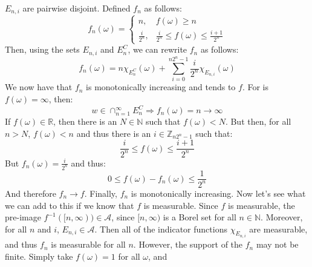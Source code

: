         $E_{n,i}$ are pairwise disjoint. Defined $f_{n}$ as
        follows:
        \begin{equation}
            f_{n}(\omega)=
            \begin{cases}
                n,&f(\omega)\geq{n}\\
                \frac{i}{2^{n}},&\frac{i}{2^{n}}
                    \leq{f}(\omega)
                    \leq\frac{i+1}{2^{n}}
            \end{cases}
        \end{equation}
        Then, using the sets $E_{n,i}$ and $E_{n}^{C}$, we
        can rewrite $f_{n}$ as follows:
        \begin{equation}
            f_{n}(\omega)=
            n\chi_{E_{n}^{C}}(\omega)+
            \sum_{i=0}^{n2^{n}-1}
                \frac{i}{2^{n}}\chi_{E_{n,i}}(\omega)
        \end{equation}
        We now have that $f_{n}$ is monotonically increasing
        and tends to $f$. For is $f(\omega)=\infty$, then:
        \begin{equation}
            w\in\cap_{n=1}^{\infty}E_{n}^{C}
            \Rightarrow
            f_{n}(\omega)=n\rightarrow\infty
        \end{equation}
        If $f(\omega)\in\mathbb{R}$, then there is an
        $N\in\mathbb{N}$ such that $f(\omega)<N$. But then, for
        all $n>N$, $f(\omega)<n$ and thus there is an
        $i\in\mathbb{Z}_{n2^{n}-1}$ such that:
        \begin{equation}
            \frac{i}{2^{n}}\leq{f}(\omega)\leq\frac{i+1}{2^{n}}
        \end{equation}
        But $f_{n}(\omega)=\frac{i}{2^{n}}$ and thus:
        \begin{equation}
            0\leq{f}(\omega)-f_{n}(\omega)\leq\frac{1}{2^{n}}
        \end{equation}
        And therefore $f_{n}\rightarrow{f}$. Finally,
        $f_{n}$ is monotonically increasing. Now let's see what
        we can add to this if we know that $f$ is measurable.
        Since $f$ is measurable, the pre-image
        $f^{-1}([n,\infty))\in\mathcal{A}$, since
        $[n,\infty)$ is a Borel set for all $n\in\mathbb{N}$.
        Moreover, for all $n$ and $i$, $E_{n,i}\in\mathcal{A}$.
        Then all of the indicator functions $\chi_{E_{n,i}}$ are
        measurable, and thus $f_{n}$ is measurable for all
        $n$. However, the support of the $f_{n}$ may not be
        finite. Simply take $f(\omega)=1$ for all $\omega$, and

